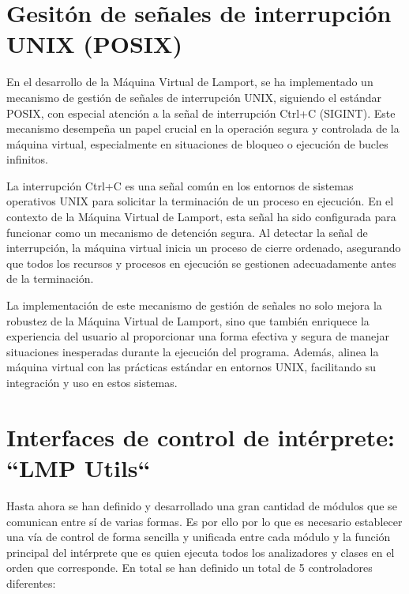 \section{Gesitón de señales de interrupción UNIX (POSIX)}\label{sec:posixSignalsLMP}
En el desarrollo de la Máquina Virtual de Lamport, se ha implementado un mecanismo de gestión de señales de interrupción UNIX, siguiendo el estándar POSIX, con especial atención a la señal de interrupción Ctrl+C (SIGINT). Este mecanismo desempeña un papel crucial en la operación segura y controlada de la máquina virtual, especialmente en situaciones de bloqueo o ejecución de bucles infinitos.

La interrupción Ctrl+C es una señal común en los entornos de sistemas operativos UNIX para solicitar la terminación de un proceso en ejecución. En el contexto de la Máquina Virtual de Lamport, esta señal ha sido configurada para funcionar como un mecanismo de detención segura. Al detectar la señal de interrupción, la máquina virtual inicia un proceso de cierre ordenado, asegurando que todos los recursos y procesos en ejecución se gestionen adecuadamente antes de la terminación.

La implementación de este mecanismo de gestión de señales no solo mejora la robustez de la Máquina Virtual de Lamport, sino que también enriquece la experiencia del usuario al proporcionar una forma efectiva y segura de manejar situaciones inesperadas durante la ejecución del programa. Además, alinea la máquina virtual con las prácticas estándar en entornos UNIX, facilitando su integración y uso en estos sistemas.

\section{Interfaces de control de intérprete: ``LMP Utils``}\label{sec:implementacionLMPUtils}
Hasta ahora se han definido y desarrollado una gran cantidad de módulos que se comunican entre sí de varias formas. Es por ello por lo que es necesario establecer una vía de control de forma sencilla y unificada entre cada módulo y la función principal del intérprete que es quien ejecuta todos los analizadores y clases en el orden que corresponde. En total se han definido un total de 5 controladores diferentes:

